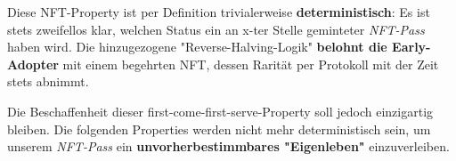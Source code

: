 \begin{NFT-Prop}
\end{NFT-Prop}

\vspace{0.3cm}

Diese NFT-Property ist per Definition trivialerweise \textbf{deterministisch}: Es ist stets zweifellos klar, welchen Status ein an x-ter Stelle geminteter \textit{NFT-Pass} haben wird. Die hinzugezogene "Reverse-Halving-Logik" \textbf{belohnt die Early-Adopter} mit einem begehrten NFT, dessen Rarität per Protokoll mit der Zeit stets abnimmt.

Die Beschaffenheit dieser first-come-first-serve-Property soll jedoch einzigartig bleiben. Die folgenden Properties werden nicht mehr deterministisch sein, um unserem \textit{NFT-Pass} ein \textbf{unvorherbestimmbares "Eigenleben"} einzuverleiben. 


\vspace{0.5cm}

